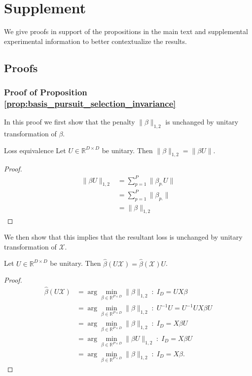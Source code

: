 \section{Supplement}
We give proofs in support of the propositions in the main text and supplemental experimental information to better contextualize the results. 

\subsection{Proofs}
\label{sec:proofs}

\subsubsection{Proof of Proposition \ref{prop:basis_pursuit_selection_invariance}}
\label{proof:basis_pursuit_program_invariance}

In this proof we first show that the penalty $\|\beta\|_{1,2}$ is unchanged by unitary transformation of $\beta$.

 \begin{proposition}{Loss equivalence}
 \label{prop:basis_pursuit_loss_equivalence}
 Let $U \in \mathbb R^{D \times D}$ be unitary.
 Then $\|\beta\|_{1,2} = \|\beta U \|$.
\end{proposition}

\begin{proof}
\begin{align}
\|\beta U \|_{1,2} &= \sum_{p = 1}^P \| \beta_{p.} U \| \\
&= \sum_{p = 1}^P \| \beta_{p.} \| \\
&= \|\beta \|_{1,2}
\end{align}
\end{proof}

We then show that this implies that the resultant loss is unchanged by unitary transformation of $\mathcal X$.

\begin{proposition}
 \label{prop:basis_pursuit_loss_equivalence}
 Let $U \in \mathbb R^{D \times D}$ be unitary.
 Then $\widehat \beta  (U \mathcal X) = \widehat \beta  ( \mathcal X) U$.
\end{proposition}

\begin{proof}
\begin{align}
\widehat \beta  (U \mathcal X)  &= \arg \min_{\beta \in \mathbb R^{P \times D}} \|\beta\|_{1,2}  \; : \; I_{D} = U X \beta \\
&= \arg \min_{\beta \in \mathbb R^{P \times D}} \|\beta\|_{1,2}  \; : \; U^{-1} U = U^{-1} U X \beta U \\
&= \arg \min_{\beta \in \mathbb R^{P \times D}} \|\beta\|_{1,2}  \; : \;  I_D = X \beta U \\
&= \arg \min_{\beta \in \mathbb R^{P \times D}} \|\beta U \|_{1,2}  \; : \;  I_D = X \beta U \\
&= \arg \min_{\beta \in \mathbb R^{P \times D}} \|\beta \|_{1,2}  \; : \;  I_D = X \beta.
\end{align}
\end{proof}

